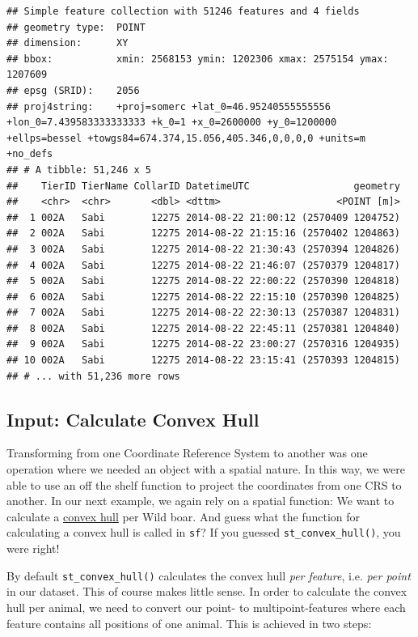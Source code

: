 \documentclass[]{book}
\begin{document}
\begin{verbatim}
## Simple feature collection with 51246 features and 4 fields
## geometry type:  POINT
## dimension:      XY
## bbox:           xmin: 2568153 ymin: 1202306 xmax: 2575154 ymax: 1207609
## epsg (SRID):    2056
## proj4string:    +proj=somerc +lat_0=46.95240555555556 +lon_0=7.439583333333333 +k_0=1 +x_0=2600000 +y_0=1200000 +ellps=bessel +towgs84=674.374,15.056,405.346,0,0,0,0 +units=m +no_defs
## # A tibble: 51,246 x 5
##    TierID TierName CollarID DatetimeUTC                  geometry
##    <chr>  <chr>       <dbl> <dttm>                    <POINT [m]>
##  1 002A   Sabi        12275 2014-08-22 21:00:12 (2570409 1204752)
##  2 002A   Sabi        12275 2014-08-22 21:15:16 (2570402 1204863)
##  3 002A   Sabi        12275 2014-08-22 21:30:43 (2570394 1204826)
##  4 002A   Sabi        12275 2014-08-22 21:46:07 (2570379 1204817)
##  5 002A   Sabi        12275 2014-08-22 22:00:22 (2570390 1204818)
##  6 002A   Sabi        12275 2014-08-22 22:15:10 (2570390 1204825)
##  7 002A   Sabi        12275 2014-08-22 22:30:13 (2570387 1204831)
##  8 002A   Sabi        12275 2014-08-22 22:45:11 (2570381 1204840)
##  9 002A   Sabi        12275 2014-08-22 23:00:27 (2570316 1204935)
## 10 002A   Sabi        12275 2014-08-22 23:15:41 (2570393 1204815)
## # ... with 51,236 more rows
\end{verbatim}

\subsection{Input: Calculate Convex
Hull}\label{input-calculate-convex-hull}

Transforming from one Coordinate Reference System to another was one
operation where we needed an object with a spatial nature. In this way,
we were able to use an off the shelf function to project the coordinates
from one CRS to another. In our next example, we again rely on a spatial
function: We want to calculate a
\href{https://en.wikipedia.org/wiki/Convex_hull}{convex hull} per Wild
boar. And guess what the function for calculating a convex hull is
called in \texttt{sf}? If you guessed \texttt{st\_convex\_hull()}, you
were right!

By default \texttt{st\_convex\_hull()} calculates the convex hull
\emph{per feature}, i.e. \emph{per point} in our dataset. This of course
makes little sense. In order to calculate the convex hull per animal, we
need to convert our point- to multipoint-features where each feature
contains all positions of one animal. This is achieved in two steps:
\end{document}
